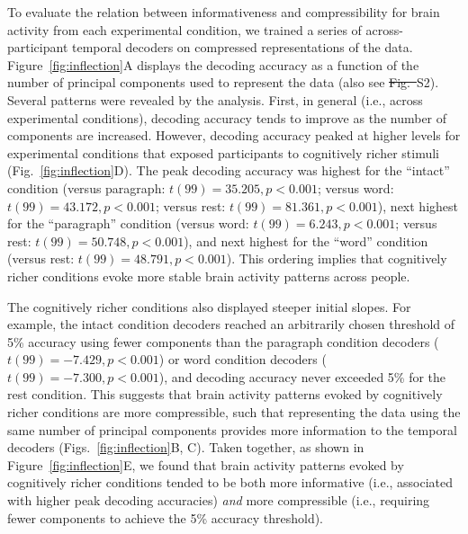 \documentclass[english, 11pt]{article}
\newcommand{\autocorr}{S1} %
\newcommand{\varExplained}{S2} %
\providecommand{\DIFaddtex}[1]{{\protect\color{blue}\uwave{#1}}} %
\providecommand{\DIFdeltex}[1]{{\protect\color{red}\sout{#1}}}                      %
\providecommand{\DIFaddbegin}{} %
\providecommand{\DIFaddend}{} %
\providecommand{\DIFdelbegin}{} %
\providecommand{\DIFdelend}{} %
\providecommand{\DIFadd}[1]{\texorpdfstring{\DIFaddtex{#1}}{#1}} %
\providecommand{\DIFdel}[1]{\texorpdfstring{\DIFdeltex{#1}}{}} %
\newcommand{\DIFscaledelfig}{0.5}
\newlength{\DIFdelgraphicswidth} %
\newlength{\DIFdelgraphicsheight} %
\newcommand{\DIFaddincludegraphics}[2][]{{\color{blue}\fbox{\DIFOincludegraphics[#1]{#2}}}} %
\newcommand{\DIFdelincludegraphics}[2][]{%
\sbox{\DIFdelgraphicsbox}{\DIFOincludegraphics[#1]{#2}}%
\settoboxwidth{\DIFdelgraphicswidth}{\DIFdelgraphicsbox} %
\settoboxtotalheight{\DIFdelgraphicsheight}{\DIFdelgraphicsbox} %
\scalebox{\DIFscaledelfig}{%
\parbox[b]{\DIFdelgraphicswidth}{\usebox{\DIFdelgraphicsbox}\\[-\baselineskip] \rule{\DIFdelgraphicswidth}{0em}}\llap{\resizebox{\DIFdelgraphicswidth}{\DIFdelgraphicsheight}{%
\setlength{\unitlength}{\DIFdelgraphicswidth}%
\begin{picture}(1,1)%
\thicklines\linethickness{2pt} %
{\color[rgb]{1,0,0}\put(0,0){\framebox(1,1){}}}%
{\color[rgb]{1,0,0}\put(0,0){\line( 1,1){1}}}%
{\color[rgb]{1,0,0}\put(0,1){\line(1,-1){1}}}%
\end{picture}%
}\hspace*{3pt}}} %
} %
\DeclareRobustCommand{\DIFaddbegin}{\DIFOaddbegin \let\includegraphics\DIFaddincludegraphics} %
\DeclareRobustCommand{\DIFaddend}{\DIFOaddend \let\includegraphics\DIFOincludegraphics} %
\DeclareRobustCommand{\DIFdelbegin}{\DIFOdelbegin \let\includegraphics\DIFdelincludegraphics} %
\DeclareRobustCommand{\DIFdelend}{\DIFOaddend \let\includegraphics\DIFOincludegraphics} %
\begin{document}
To evaluate the relation between informativeness and compressibility for brain
activity from each experimental condition, we trained a series of
across-participant temporal decoders on compressed representations of the data.
Figure~\ref{fig:inflection}A displays the decoding accuracy as a function of
the number of principal components used to represent the data (also see
\DIFdelbegin \DIFdel{Fig.~}\DIFdelend \DIFaddbegin \DIFadd{Figs.~\autocorr~and }\DIFaddend \varExplained). Several patterns were revealed by the analysis. First, in
general (i.e., across experimental conditions), decoding accuracy tends to
improve as the number of components are increased. However, decoding accuracy
peaked at higher levels for experimental conditions that exposed participants
to cognitively richer stimuli (Fig.~\ref{fig:inflection}D). The peak decoding
accuracy was highest for the ``intact'' condition (versus paragraph: $t(99) =
35.205, p < 0.001$; versus word: $t(99) = 43.172, p < 0.001$; versus rest:
$t(99) = 81.361, p < 0.001$), next highest for the ``paragraph'' condition
(versus word: $t(99) = 6.243, p < 0.001$; versus rest: $t(99) = 50.748, p <
0.001$), and next highest for the ``word'' condition (versus rest: $t(99) =
48.791, p < 0.001$). This ordering implies that cognitively richer conditions
evoke more stable brain activity patterns across people.

The cognitively richer conditions also displayed steeper initial slopes. For
example, the intact condition decoders reached an arbitrarily chosen threshold
of 5\% accuracy using fewer components than the paragraph condition decoders
($t(99) = -7.429, p < 0.001$) or word condition decoders ($t(99) = -7.300, p <
0.001$), and decoding accuracy never exceeded 5\% for the rest condition. This
suggests that brain activity patterns evoked by cognitively richer conditions
are more compressible, such that representing the data using the same number of
principal components provides more information to the temporal decoders
(Figs.~\ref{fig:inflection}B, C). Taken together, as shown in
Figure~\ref{fig:inflection}E, we found that brain activity patterns evoked by
cognitively richer conditions tended to be both more informative (i.e.,
associated with higher peak decoding accuracies) \textit{and} more compressible
(i.e., requiring fewer components to achieve the 5\% accuracy threshold).
\end{document}
